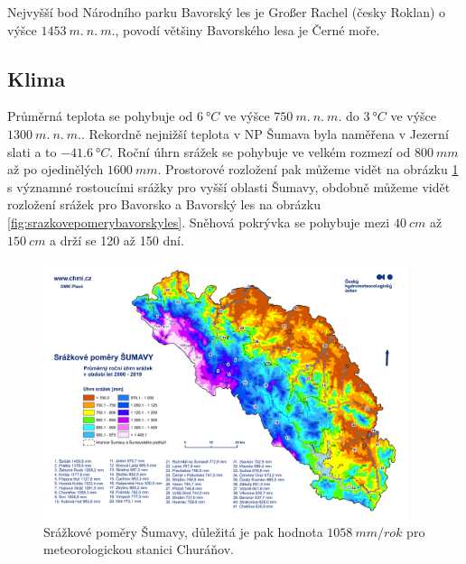 Nejvyšší bod Národního parku Bavorský les je Großer Rachel (česky Roklan) o výšce $\SI{1453}{m.\ n.\ m.}$, povodí většiny Bavorského lesa je Černé moře.

\subsection{Klima}
Průměrná teplota se pohybuje od $\SI{6}{\degree C}$ ve výšce $\SI{750}{m.\ n.\ m.}$ do $\SI{3}{\degree C}$ ve výšce $\SI{1300}{m.\ n.\ m.}$. Rekordně nejnižší teplota v NP Šumava byla naměřena v Jezerní slati a to $\SI{-41.6}{\degree C}$. Roční úhrn srážek se pohybuje ve velkém rozmezí od $\SI{800}{mm}$ až po ojedinělých $\SI{1600}{mm}$. Prostorové rozložení pak můžeme vidět na obrázku \ref{fig:srazkovepomerysumava} s významné rostoucími srážky pro vyšší oblasti Šumavy, obdobně můžeme vidět rozložení srážek pro Bavorsko a Bavorský les na obrázku \ref{fig:srazkovepomerybavorskyles}. Sněhová pokrývka se pohybuje mezi $\SI{40}{cm}$ až $\SI{150}{cm}$ a drží se 120 až 150 dní\cite{npsumava}.

\begin{figure}
	\centering
	\includegraphics[width=0.95\textwidth]{img/ch1/srazkovepomerysumava.png}
	\caption{Srážkové poměry Šumavy\cite{srazkovepomerysumava}, důležitá je pak hodnota $\SI{1058}{mm/rok}$ pro meteorologickou stanici Churáňov.}
	\label{fig:srazkovepomerysumava}
\end{figure}

